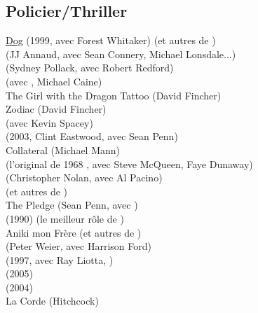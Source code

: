 \subsection{Policier/Thriller}
\href{http://www.telerama.fr/cinema/films/ghost-dog-la-voie-du-samourai,46863.php}{Dog}
(1999, avec Forest Whitaker) (et autres de \JimJarmusch) \\
 (JJ Annaud, avec Sean Connery, Michael Lonsdale...) \\
 (Sydney Pollack, avec Robert Redford) \\
   (avec \DustinHoffman, Michael Caine)\\
The Girl with the Dragon Tattoo (David Fincher)\\
Zodiac (David Fincher)\\
 (avec Kevin Spacey)\\
 (2003, Clint Eastwood, avec Sean Penn)\\
Collateral (Michael Mann)\\
 (l'original de 1968 , avec Steve McQueen, Faye Dunaway) \beau \\
 (Christopher Nolan, avec Al Pacino)\\
 (et autres de \DavidCronemberg)\\
The Pledge (Sean Penn, avec \JackNicholson)\\
 (1990) (le meilleur rôle de \ChristopherWalken) \beau \\
Aniki mon Frère (et autres de \TakeshiKitano)\\
 (Peter Weier, avec Harrison Ford)\\
 (1997, avec Ray Liotta, \HarveyKeitel)\\
 (2005) \\
 (2004) \\
La Corde (Hitchcock) \\

